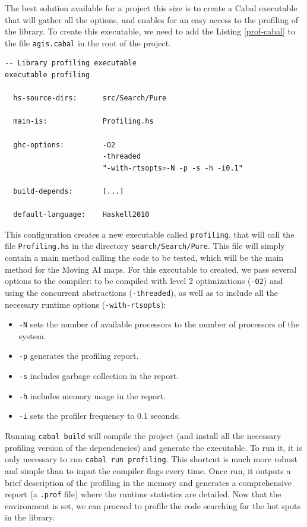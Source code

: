 The best solution available for a project this size is to create a Cabal
executable that will gather all the options, and enables for an easy access to
the profiling of the library. To create this executable, we need to add the
Listing \ref{prof-cabal} to the file \texttt{agis.cabal} in the root of the
project.\\

\begin{lstlisting}[style=haskell, label=prof-cabal, caption=
Setup for the \texttt{profiling} executable in the Cabal file]
-- Library profiling executable
executable profiling

  hs-source-dirs:      src/Search/Pure
           
  main-is:             Profiling.hs
  
  ghc-options:         -O2
                       -threaded
                       "-with-rtsopts=-N -p -s -h -i0.1"

  build-depends:       [...]

  default-language:    Haskell2010
\end{lstlisting}

This configuration creates a new executable called \texttt{profiling}, that
will call the file \texttt{Profiling.hs} in the directory
\texttt{search/Search/Pure}. This file will simply contain a main method
calling the code to be tested, which will be the main method for the Moving AI
maps. For this executable to created, we pass several options to the compiler:
to be compiled with level 2 optimizations (\texttt{-O2}) and using the
concurrent abstractions (\texttt{-threaded}), as well as to include all the
necessary runtime options (\texttt{-with-rtsopts}):

\begin{itemize}
\item \texttt{-N} sets the number of available processors to the number of
  processors of the system.
\item \texttt{-p} generates the profiling report.
\item \texttt{-s} includes garbage collection in the report.
\item \texttt{-h} includes memory usage in the report.
\item \texttt{-i} sets the profiler frequency to 0.1 seconds.  
\end{itemize}

Running \texttt{cabal build} will compile the project (and install all the
necessary profiling version of the dependencies) and generate the executable.
To run it, it is only necessary to run \texttt{cabal run profiling}. This
shortcut is much more robust and simple than to input the compiler flags every
time. Once run, it outputs a brief description of the profiling in the memory
and generates a comprehensive report (a \texttt{.prof} file) where the runtime
statistics are detailed. Now that the environment is set, we can proceed to
profile the code searching for the hot spots in the library.



